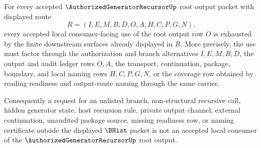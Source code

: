 \begin{lemma}
\label{lem:authorized-generator-recursor-root-output-consumer-downstream-coverage}
For every accepted $\AuthorizedGeneratorRecursorUp$ root output packet with displayed route
$$
R=(I,E,M,B,D,O,A,H,C,P,G,N),
$$
every accepted local consumer-facing use of the root output row $O$ is exhausted by the finite downstream surfaces already displayed in $R$. More precisely, the use must factor through the authorization and branch alternatives $I,E,M,B,D$, the output and audit ledger rows $O,A$, the transport, continuation, package, boundary, and local naming rows $H,C,P,G,N$, or the coverage row obtained by reading readiness and output-route naming through the same carrier.

Consequently a request for an unlisted branch, non-structural recursive call, hidden generator state, host recursion rule, private output channel, external continuation, unaudited package source, missing readiness row, or naming certificate outside the displayed $\BHist$ packet is not an accepted local consumer of the $\AuthorizedGeneratorRecursorUp$ root output.
\end{lemma}
